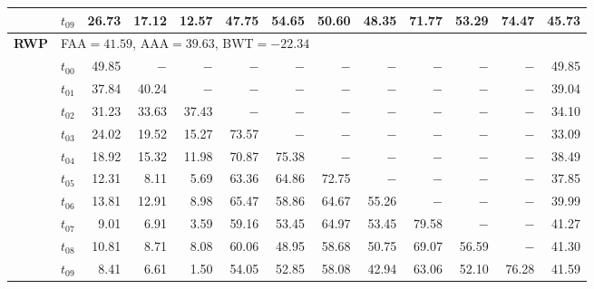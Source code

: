\begin{table}[ht]
\begin{tabular}{@{}l l r r r r r r r r r r r@{}}
 & $t_{09}$ & 26.73 & 17.12 & 12.57 & 47.75 & 54.65 & 50.60 & 48.35 & 71.77 & 53.29 & 74.47 & 45.73 \\
\midrule
\multirow{11}{*}{\textbf{RWP}} & \multicolumn{12}{l}{\quad\small FAA$=41.59$,\; AAA$=39.63$,\; BWT$=-22.34$} \\
 & $t_{00}$ & 49.85 & $-$ & $-$ & $-$ & $-$ & $-$ & $-$ & $-$ & $-$ & $-$ & 49.85 \\
 & $t_{01}$ & 37.84 & 40.24 & $-$ & $-$ & $-$ & $-$ & $-$ & $-$ & $-$ & $-$ & 39.04 \\
 & $t_{02}$ & 31.23 & 33.63 & 37.43 & $-$ & $-$ & $-$ & $-$ & $-$ & $-$ & $-$ & 34.10 \\
 & $t_{03}$ & 24.02 & 19.52 & 15.27 & 73.57 & $-$ & $-$ & $-$ & $-$ & $-$ & $-$ & 33.09 \\
 & $t_{04}$ & 18.92 & 15.32 & 11.98 & 70.87 & 75.38 & $-$ & $-$ & $-$ & $-$ & $-$ & 38.49 \\
 & $t_{05}$ & 12.31 & 8.11 & 5.69 & 63.36 & 64.86 & 72.75 & $-$ & $-$ & $-$ & $-$ & 37.85 \\
 & $t_{06}$ & 13.81 & 12.91 & 8.98 & 65.47 & 58.86 & 64.67 & 55.26 & $-$ & $-$ & $-$ & 39.99 \\
 & $t_{07}$ & 9.01 & 6.91 & 3.59 & 59.16 & 53.45 & 64.97 & 53.45 & 79.58 & $-$ & $-$ & 41.27 \\
 & $t_{08}$ & 10.81 & 8.71 & 8.08 & 60.06 & 48.95 & 58.68 & 50.75 & 69.07 & 56.59 & $-$ & 41.30 \\
 & $t_{09}$ & 8.41 & 6.61 & 1.50 & 54.05 & 52.85 & 58.08 & 42.94 & 63.06 & 52.10 & 76.28 & 41.59 \\
\bottomrule
\end{tabular}
\end{table}

